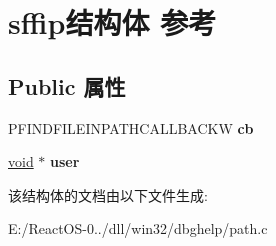 \hypertarget{structsffip}{}\section{sffip结构体 参考}
\label{structsffip}
\subsection*{Public 属性}
\begin{DoxyCompactItemize}
\item 
\mbox{\label{structsffip_a387866b9a945dc0a565f02d5b9a9cb08}} 
P\+F\+I\+N\+D\+F\+I\+L\+E\+I\+N\+P\+A\+T\+H\+C\+A\+L\+L\+B\+A\+C\+KW {\bfseries cb}
\item 
\mbox{\label{structsffip_afd155c3640c082c9069a2c95eef5ef9b}} 
\hyperlink{interfacevoid}{void} $\ast$ {\bfseries user}
\end{DoxyCompactItemize}


该结构体的文档由以下文件生成\+:\begin{DoxyCompactItemize}
\item 
E\+:/\+React\+O\+S-\/0../dll/win32/dbghelp/path.\+c\end{DoxyCompactItemize}
